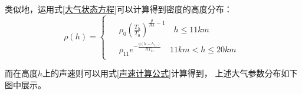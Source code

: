 类似地，运用式\ref{大气状态方程}可以计算得到密度的高度分布：
\begin{equation}
    \rho (h)=
    \begin{cases}
        \begin{aligned}
            &\rho_0\left(\frac{T_h}{T_0}\right)^{\frac{g}{R\lambda} - 1} \quad h\leq 11km\\
            & \rho_{11} e^{-\frac{g(h - h_{11})}{RT_{11}}} \quad 11km<h \leq 20km
        \end{aligned}
    \end{cases}
\end{equation}

而在高度$h$上的声速则可以用式\ref{声速计算公式}计算得到，
上述大气参数分布如下图中展示。

\begin{figure}[H]
    \centering
    \quad
\end{figure}
